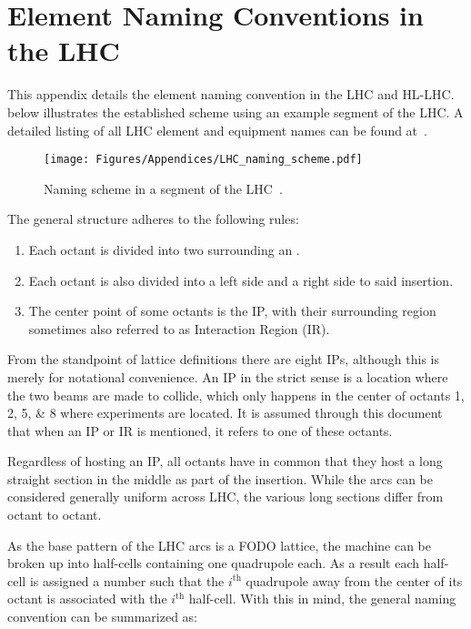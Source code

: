 \chapter{Element Naming Conventions in the LHC}
\label{appendix:naming_conventions}

This appendix details the element naming convention in the \gls{LHC} and \gls{HL-LHC}.
 below illustrates the established scheme using an example segment of the LHC.
A detailed listing of all LHC element and equipment names can be found at~\cite{CERN:Equipment_Codes}.

\begin{figure}[h]
    \centering
    \texttt{[image: Figures/Appendices/LHC\_naming\_scheme.pdf]}
    \caption{Naming scheme in a segment of the LHC~\cite{CERN:Element_Naming}.}
    \label{figure:lhc_segment_naming_scheme}
\end{figure}

The general structure adheres to the following rules:
\begin{enumerate}
    \item Each octant is divided into two  surrounding an .
    \item Each octant is also divided into a left side and a right side to said insertion.
    \item The center point of some octants is the \gls{IP}, with their surrounding region sometimes also referred to as Interaction Region (\acrshort{IR}).
\end{enumerate}

From the standpoint of lattice definitions there are eight IPs, although this is merely for notational convenience. 
An \acrlong{IP} in the strict sense is a location where the two beams are made to collide, which only happens in the center of octants \numlist{1;2;5;8} where \glspl{experiment} are located.
It is assumed through this document that when an IP or IR is mentioned, it refers to one of these octants.

Regardless of hosting an IP, all octants have in common that they host a long straight section in the middle as part of the insertion.
While the arcs can be considered generally uniform across LHC, the various long sections differ from octant to octant.

As the base pattern of the LHC arcs is a FODO lattice, the machine can be broken up into half-cells containing one quadrupole each.
As a result each half-cell is assigned a number such that the \(i^{\mathrm{th}}\) quadrupole away from the center of its octant is associated with the \(i^{\mathrm{th}}\) half-cell.
With this in mind, the general naming convention can be summarized as:

